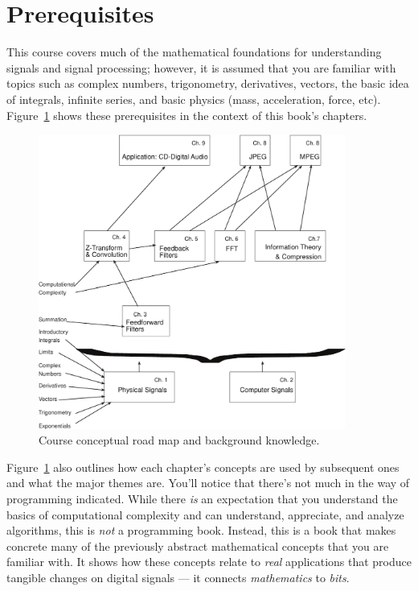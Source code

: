 \section*{Prerequisites}

This course covers much of the mathematical
foundations for understanding signals and signal processing; however,
it is assumed that you are familiar with topics such as complex
numbers, trigonometry, derivatives, vectors, the basic idea of
integrals, infinite series, and basic physics (mass, acceleration,
force, etc). Figure~\ref{fg:roadmap} shows these prerequisites in the
context of this book's chapters.

\begin{figure}
\vspace{2in}
\centerline{\includegraphics[width=0.9\textwidth]{roadmap}}
\caption[Course conceptual road map]{Course conceptual road
map and background knowledge.\label{fg:roadmap}}
\end{figure}

Figure~\ref{fg:roadmap} also outlines how each chapter's concepts are
used by subsequent ones and what the major themes are. You'll notice
that there's not much in the way of programming indicated. While there
\emph{is} an expectation that you understand the basics of
computational complexity and can understand, appreciate, and analyze
algorithms, this is \emph{not} a programming book. Instead, this is a
book that makes concrete many of the previously abstract mathematical
concepts that you are familiar with. It shows how these concepts
relate to \emph{real} applications that produce tangible changes on
digital signals --- it connects \emph{mathematics} to \emph{bits}.

